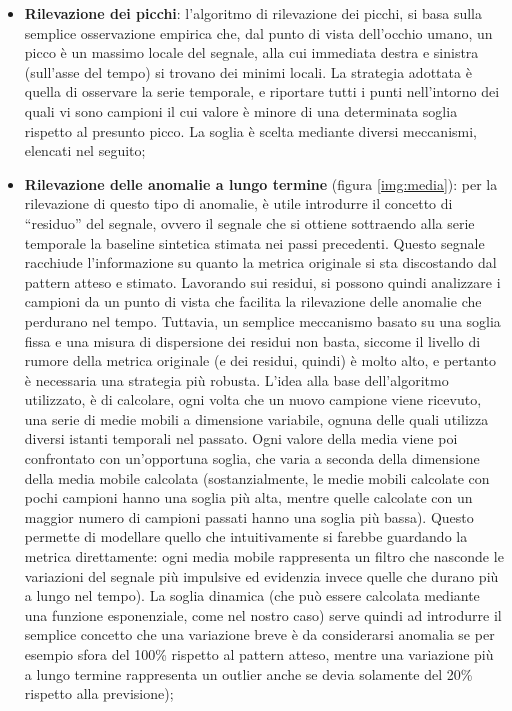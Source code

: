 \documentclass[12pt,a4paper,cucitura]{toptesi}
\begin{document}
\begin{itemize}
\item \textbf{Rilevazione dei picchi}: l'algoritmo di rilevazione dei picchi, si basa sulla semplice osservazione empirica che, dal punto di vista dell'occhio umano, un picco è un massimo locale del segnale, alla cui immediata destra e sinistra (sull'asse del tempo) si trovano dei minimi locali.
La strategia adottata è quella di osservare la serie temporale, e riportare tutti i punti nell'intorno dei quali vi sono campioni il cui valore è minore di una determinata soglia rispetto al presunto picco.
La soglia è scelta mediante diversi meccanismi, elencati  nel seguito;

\item \textbf{Rilevazione delle anomalie a lungo termine} (figura \ref{img:media}): per la rilevazione di questo tipo di anomalie, è utile introdurre il concetto di ``residuo'' del segnale, ovvero il segnale che si ottiene sottraendo alla serie temporale la baseline sintetica stimata nei passi precedenti.
Questo segnale racchiude l'informazione su quanto la metrica originale si sta discostando dal pattern atteso e stimato.
Lavorando sui residui, si possono quindi analizzare i campioni da un punto di vista che facilita la rilevazione delle anomalie che perdurano nel tempo.
Tuttavia, un semplice meccanismo basato su una soglia fissa e una misura di dispersione dei residui non basta, siccome il livello di rumore della metrica originale (e dei residui, quindi) è molto alto, e pertanto è necessaria una strategia più robusta.
L'idea alla base dell'algoritmo utilizzato, è di calcolare, ogni volta che un nuovo campione viene ricevuto, una serie di medie mobili a dimensione variabile, ognuna delle quali utilizza diversi istanti temporali nel passato.
Ogni valore della media viene poi confrontato con un'opportuna soglia, che varia a seconda della dimensione della media mobile calcolata (sostanzialmente, le medie mobili calcolate con pochi campioni hanno una soglia più alta, mentre quelle calcolate con un maggior numero di campioni passati hanno una soglia più bassa).
Questo permette di modellare quello che intuitivamente si farebbe guardando la metrica direttamente: ogni media mobile rappresenta un filtro che nasconde le variazioni del segnale più impulsive ed evidenzia invece quelle che durano più a lungo nel tempo). 
La soglia dinamica (che può essere calcolata mediante una funzione esponenziale, come nel nostro caso) serve quindi ad introdurre il semplice concetto che una variazione breve è da considerarsi anomalia se per esempio sfora del 100\% rispetto al pattern atteso, mentre una variazione più a lungo termine rappresenta un outlier anche se devia solamente del 20\% rispetto alla previsione);
\end{itemize}
\end{document}

